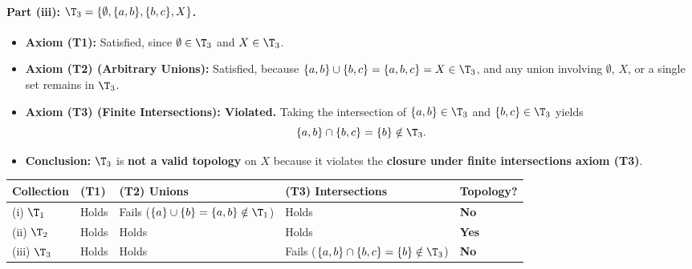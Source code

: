 \paragraph{Part (iii): $\T_3=\{\emptyset,\{a,b\},\{b,c\},X\}$.}
\begin{itemize}
  \item \textbf{Axiom (T1):} Satisfied, since $\emptyset\in\T_3$ and $X\in\T_3$.
  \item \textbf{Axiom (T2) (Arbitrary Unions):} Satisfied, because
        $\{a,b\}\cup\{b,c\}=\{a,b,c\}=X\in\T_3$, and any union involving $\emptyset$, $X$,
        or a single set remains in $\T_3$.
  \item \textbf{Axiom (T3) (Finite Intersections): Violated.} Taking the intersection of
        $\{a,b\}\in\T_3$ and $\{b,c\}\in\T_3$ yields
        \[ \{a,b\}\cap\{b,c\}=\{b\}\notin\T_3. \]
  \item \textbf{Conclusion:} $\T_3$ is \textbf{not a valid topology} on $X$ because it
        violates the \textbf{closure under finite intersections axiom (T3)}.
\end{itemize}

\begin{center}
\small
\begin{tabular}{@{}lllll@{}}
  \toprule
  \textbf{Collection} & \textbf{(T1)} & \textbf{(T2) Unions} & \textbf{(T3) Intersections}
    & \textbf{Topology?} \\
  \midrule
  (i) $\T_1$   & Holds & Fails ($\{a\}\cup\{b\}=\{a,b\}\notin\T_1$) & Holds & \textbf{No} \\
  (ii) $\T_2$  & Holds & Holds & Holds & \textbf{Yes} \\
  (iii) $\T_3$ & Holds & Holds & Fails ($\{a,b\}\cap\{b,c\}=\{b\}\notin\T_3$) & \textbf{No} \\
  \bottomrule
\end{tabular}
\end{center}
